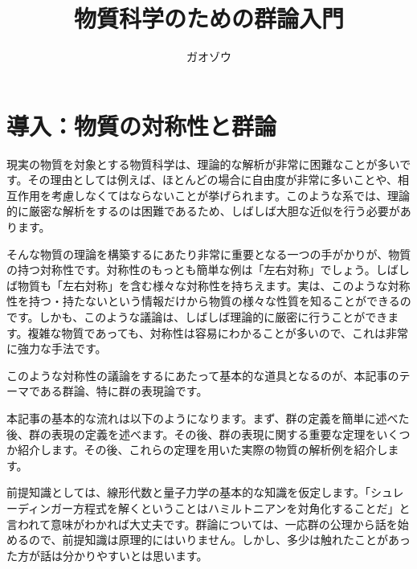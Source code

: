 \documentclass[uplatex,dvipdfmx,a4j]{jsarticle}
\title{物質科学のための群論入門}
\author{ガオゾウ}
\begin{document}
\maketitle
\section{導入：物質の対称性と群論}
現実の物質を対象とする物質科学は、理論的な解析が非常に困難なことが多いです。その理由としては例えば、ほとんどの場合に自由度が非常に多いことや、相互作用を考慮しなくてはならないことが挙げられます。このような系では、理論的に厳密な解析をするのは困難であるため、しばしば大胆な近似を行う必要があります。

そんな物質の理論を構築するにあたり非常に重要となる一つの手がかりが、物質の持つ対称性です。対称性のもっとも簡単な例は「左右対称」でしょう。しばしば物質も「左右対称」を含む様々な対称性を持ちえます。実は、このような対称性を持つ・持たないという情報だけから物質の様々な性質を知ることができるのです。しかも、このような議論は、しばしば理論的に厳密に行うことができます。複雑な物質であっても、対称性は容易にわかることが多いので、これは非常に強力な手法です。



このような対称性の議論をするにあたって基本的な道具となるのが、本記事のテーマである群論、特に群の表現論です。

本記事の基本的な流れは以下のようになります。まず、群の定義を簡単に述べた後、群の表現の定義を述べます。その後、群の表現に関する重要な定理をいくつか紹介します。その後、これらの定理を用いた実際の物質の解析例を紹介します。

前提知識としては、線形代数と量子力学の基本的な知識を仮定します。「シュレーディンガー方程式を解くということはハミルトニアンを対角化することだ」と言われて意味がわかれば大丈夫です。群論については、一応群の公理から話を始めるので、前提知識は原理的にはいりません。しかし、多少は触れたことがあった方が話は分かりやすいとは思います。
\end{document}
